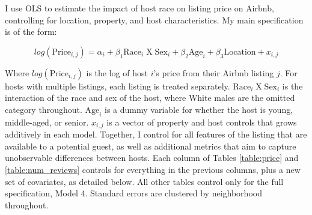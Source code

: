 
I use OLS to estimate the impact of host race on listing price on Airbnb, controlling for location, property, and host characteristics. My main specification is of the form:

\[ log(\text{Price}_{i,j}) = \alpha_i + \beta_1 \text{Race}_{i} \;  \text{X} \; \text{Sex}_i + \beta_2 \text{Age}_i + \beta_3 \text{Location} +  x_{i,j} \]

Where $log(\text{Price}_{i,j})$ is the log of host $i$'s price from their Airbnb listing $j$. For hosts with multiple listings, each listing is treated separately. $\text{Race}_{i} \;  \text{X} \; \text{Sex}_i$ is the interaction of the race and sex of the host, where White males are the omitted category throughout. $\text{Age}_i$ is a dummy variable for whether the host is young, middle-aged, or senior. $x_{i,j}$ is a vector of property and host controls that grows additively in each model. Together, I control for all features of the listing that are available to a potential guest, as well as additional metrics that aim to capture unobservable differences between hosts. Each column of Tables \ref{table:price} and \ref{table:num_reviews} controls for everything in the previous columns, plus a new set of covariates, as detailed below. All other tables control only for the full specification, Model 4. Standard errors are clustered by neighborhood throughout.

